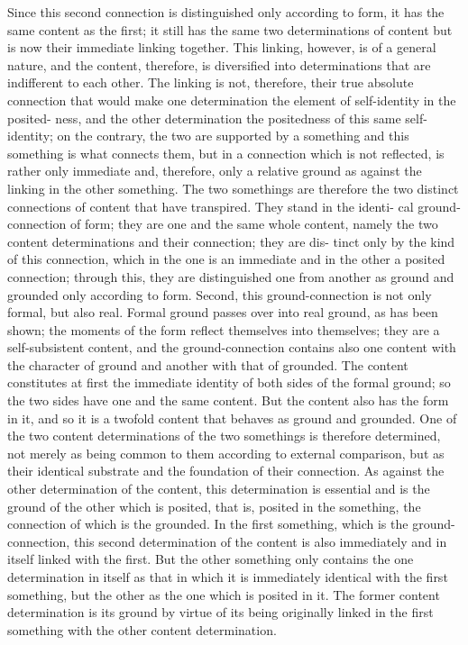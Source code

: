 Since this second connection is distinguished
only according to form, it has the same content as the first; it still has the
same two determinations of content but is now their immediate linking
together. This linking, however, is of a general nature, and the content,
therefore, is diversified into determinations that are indifferent to each
other. The linking is not, therefore, their true absolute connection that
would make one determination the element of self-identity in the posited-
ness, and the other determination the positedness of this same self-identity;
on the contrary, the two are supported by a something and this something
is what connects them, but in a connection which is not reflected, is rather
only immediate and, therefore, only a relative ground as against the linking
in the other something. The two somethings are therefore the two distinct
connections of content that have transpired. They stand in the identi-
cal ground-connection of form; they are one and the same whole content,
namely the two content determinations and their connection; they are dis-
tinct only by the kind of this connection, which in the one is an immediate
and in the other a posited connection; through this, they are distinguished
one from another as ground and grounded only according to form.  Second,
this ground-connection is not only formal, but also real. Formal ground
passes over into real ground, as has been shown; the moments of the form
reflect themselves into themselves; they are a self-subsistent content, and
the ground-connection contains also one content with the character of
ground and another with that of grounded. The content constitutes at first
the immediate identity of both sides of the formal ground; so the two sides
have one and the same content. But the content also has the form in it, and
so it is a twofold content that behaves as ground and grounded. One of the
two content determinations of the two somethings is therefore determined,
not merely as being common to them according to external comparison,
but as their identical substrate and the foundation of their connection.
As against the other determination of the content, this determination is
essential and is the ground of the other which is posited, that is, posited
in the something, the connection of which is the grounded. In the first
something, which is the ground-connection, this second determination of
the content is also immediately and in itself linked with the first. But the
other something only contains the one determination in itself as that in
which it is immediately identical with the first something, but the other
as the one which is posited in it. The former content determination is its
ground by virtue of its being originally linked in the first something with
the other content determination.


